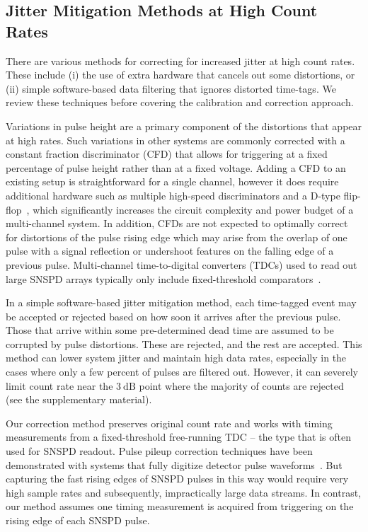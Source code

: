 \documentclass[11pt]{caltech_thesis} %
\begin{document}
\hypertarget{jitter-mitigation-methods-at-high-count-rates}{%
\subsection{Jitter Mitigation Methods at High Count Rates}\label{jitter-mitigation-methods-at-high-count-rates}}

There are various methods for correcting for increased jitter at high count rates. These include (i) the use of extra hardware that cancels out some distortions, or (ii) simple software-based data filtering that ignores distorted time-tags. We review these techniques before covering the calibration and correction approach.

Variations in pulse height are a primary component of the distortions that appear at high rates. Such variations in other systems are commonly corrected with a constant fraction discriminator (CFD) that allows for triggering at a fixed percentage of pulse height rather than at a fixed voltage. Adding a CFD to an existing setup is straightforward for a single channel, however it does require additional hardware such as multiple high-speed discriminators and a D-type flip-flop~\autocite{Becker2005}, which significantly increases the circuit complexity and power budget of a multi-channel system. In addition, CFDs are not expected to optimally correct for distortions of the pulse rising edge which may arise from the overlap of one pulse with a signal reflection or undershoot features on the falling edge of a previous pulse. Multi-channel time-to-digital converters (TDCs) used to read out large SNSPD arrays typically only include fixed-threshold comparators~\autocite{Wollman2019}.

In a simple software-based jitter mitigation method, each time-tagged event may be accepted or rejected based on how soon it arrives after the previous pulse. Those that arrive within some pre-determined dead time are assumed to be corrupted by pulse distortions. These are rejected, and the rest are accepted. This method can lower system jitter and maintain high data rates, especially in the cases where only a few percent of pulses are filtered out. However, it can severely limit count rate near the $3~\mathrm{dB}$ point where the majority of counts are rejected (see the supplementary material).

Our correction method preserves original count rate and works with timing measurements from a fixed-threshold free-running TDC -- the type that is often used for SNSPD readout. Pulse pileup correction techniques have been demonstrated with systems that fully digitize detector pulse waveforms~\autocite{Behbahani2019,scoullar_evans_2009,Haselman2010}. But capturing the fast rising edges of SNSPD pulses in this way would require very high sample rates and subsequently, impractically large data streams. In contrast, our method assumes one timing measurement is acquired from triggering on the rising edge of each SNSPD pulse.
\end{document}
